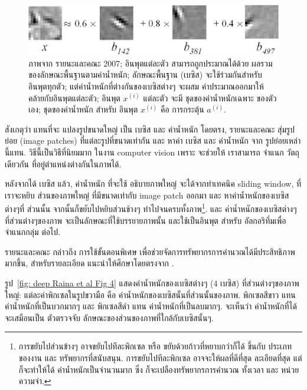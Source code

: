 %
\begin{figure}
\begin{center}
\includegraphics[width=5in]{04SelfTaught/RainaEtAlFig3.png}
\end{center}
\caption{ภาพจาก รายนะและคณะ 2007; 
อินพุตแต่ละตัว สามารถถูกประมาณได้ด้วย ผลรวมของลักษณะพื้นฐานตามค่าน้ำหนัก;
ลักษณะพื้นฐาน (เบซิส) จะใช้ร่วมกันสำหรับ อินพุตทุกตัว;
แต่ค่าน้ำหนักที่ต่างกันของเบซิสต่างๆ จะผสม ค่าประมาณออกมาให้คล้ายกับอินพุตแต่ละตัว;
อินพุต $x^{(i)}$ แต่ละตัว  จะมี ชุดของค่าน้ำหนักเฉพาะ ของตัวเอง;
ชุดของค่าน้ำหนัก สำหรับ อินพุต $x^{(i)}$ คือ การกระตุ้น $a^{(i)}$.}
\label{fig: deep Raina et al Fig 3}
\end{figure}
%

\begin{minipage}{5.5in}
{\small
\begin{shaded}
สังเกตุว่า แทนที่จะ แปลงรูปขนาดใหญ่ เป็น เบซิส และ ค่าน้ำหนัก โดยตรง, 
รายนะและคณะ สุ่มรูปย่อย (image patches) ที่แต่ละรูปที่ขนาดเท่ากัน และ หาค่า เบซิส และ ค่าน้ำหนัก จาก รูปย่อยเหล่านี้แทน.
วิธีนี้เป็นวิธีที่นิยมมาก ในงาน computer vision เพราะ จะช่วยให้ เราสามารถ จำแนก วัตถุเดียวกัน ที่อยู่ตำแหน่งต่างกันในภาพได้.

หลังจากได้ เบซิส แล้ว, ค่าน้ำหนัก ที่จะใช้ อธิบายภาพใหญ่ จะได้จากทำเทคนิค sliding window,
ที่เราจะหยิบ ส่วนของภาพใหญ่ ที่มีขนาดเท่ากับ image patch ออกมา และ หาค่าน้ำหนักของเบซิสต่างๆที่ ส่วนนั้น จากนั้นก็ขยับไปหยิบส่วนข้างๆ ทำไปจนครบทั้งภาพ\footnote{
การขยับไปส่วนข้างๆ อาจขยับไปทีละพิกเซล หรือ ขยับด้วยก้าวที่หยาบกว่าก็ได้ ขึ้นกับ ประเภทของงาน และ ทรัพยากรที่สนับสนุน.
การขยับไปทีละพิกเซล อาจจะให้ผลที่ดีที่สุด ละเอียดที่สุด แต่ก็จะทำให้ได้ ค่าน้ำหนักเป็นจำนวนมาก ซึ่ง ก็จะเปลืองทรัพยากรการคำนวณ ทั้งเวลา และ หน่วยความจำ.
}.
และ ค่าน้ำหนักของเบซิสต่างๆ ที่ส่วนต่างๆของภาพ จะเป็นลักษณะที่ใช้บรรยายภาพนั้น และใช้เป็นอินพุต สำหรับ อัลกอริทึ่มเพื่อจำแนกกลุ่ม ต่อไป.

รายนะและคณะ กล่าวถึง การใช้ขั้นตอนพิเศษ เพื่อช่วยจัดการทรัพยากรการคำนวณได้มีประสิทธิภาพมากขึ้น, สำหรับรายละเอียด แนะนำให้ศึกษาโดยตรงจาก \cite{RainaEtAl2007a}.

รูป~\ref{fig: deep Raina et al Fig 4} แสดงค่าน้ำหนักของเบซิสต่างๆ ($4$ เบซิส) ที่ส่วนต่างๆของภาพใหญ่: แต่ละค่าพิกเซลในรูปขวามือ คือ ค่าน้ำหนักของเบซิสนั้นที่ส่วนนั้นของภาพ.
พิกเซลสีขาว แทน ค่าน้ำหนักที่เป็นบวกมากๆ และ พิกเซลสีดำ แทน ค่าน้ำหนักที่เป็นลบมากๆ.
จะเห็นว่า ค่าน้ำหนักที่ได้ จะเสมือนเป็น ตัวตรวจจับ ลักษณะของส่วนของภาพที่ใกล้กับเบซิสนั้นๆ.

\end{shaded}
}

\end{minipage}

